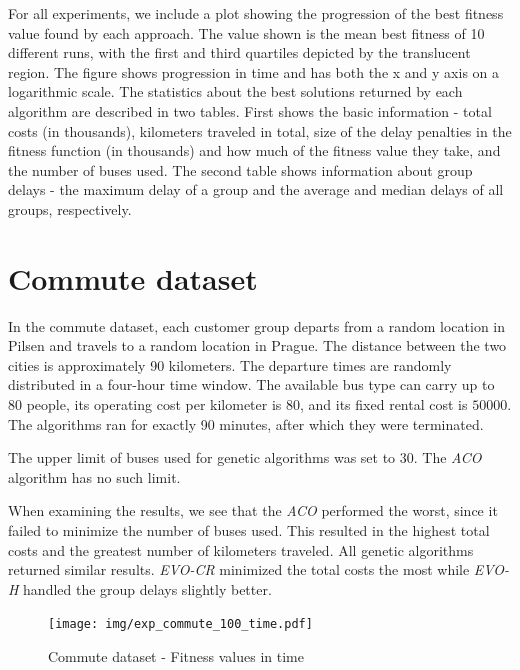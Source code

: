 For all experiments, we include a plot showing the progression of the best fitness value found by each approach. The value shown is the mean best fitness of 10 different runs, with the first and third quartiles depicted by the translucent region. The figure shows progression in time and has both the x and y axis on a logarithmic scale. The statistics about the best solutions returned by each algorithm are described in two tables. First shows the basic information - total costs (in thousands), kilometers traveled in total, size of the delay penalties in the fitness function (in thousands) and how much of the fitness value they take, and the number of buses used. The second table shows information about group delays - the maximum delay of a group and the average and median delays of all groups, respectively.

\section{Commute dataset}

In the commute dataset, each customer group departs from a random location in Pilsen and travels to a random location in Prague. The distance between the two cities is approximately 90 kilometers. The departure times are randomly distributed in a four-hour time window. The available bus type can carry up to $80$ people, its operating cost per kilometer is $80$, and its fixed rental cost is $50000$. The algorithms ran for exactly 90 minutes, after which they were terminated.

The upper limit of buses used for genetic algorithms was set to $30$. The \textit{ACO} algorithm has no such limit.

When examining the results, we see that the \textit{ACO} performed the worst, since it failed to minimize the number of buses used. This resulted in the highest total costs and the greatest number of kilometers traveled. All genetic algorithms returned similar results. \textit{EVO-CR} minimized the total costs the most while \textit{EVO-H} handled the group delays slightly better.

\clearpage

\begin{figure}
    \centering
    \texttt{[image: img/exp\_commute\_100\_time.pdf]}
    \caption{Commute dataset - Fitness values in time}
    \label{fig:exp_commute}
\end{figure}

